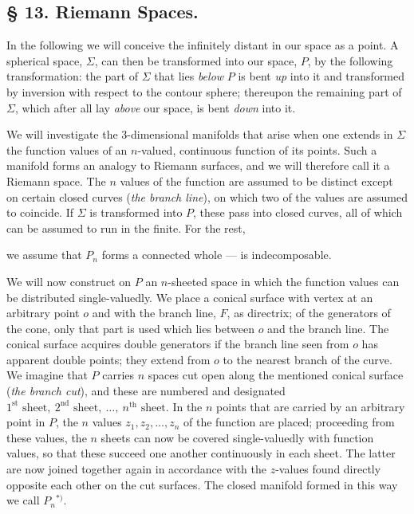 \documentclass{article}
\begin{document}
\subsection*{§ 13. Riemann Spaces.}

In the following we will conceive the infinitely distant in our space as a point. A spherical space, $\Sigma$, can then be transformed into our space, $P$, by the following transformation: the part of $\Sigma$ that lies \emph{below} $P$ is bent \emph{up} into it and transformed by inversion with respect to the contour sphere; thereupon the remaining part of $\Sigma$, which after all lay \emph{above} our space, is bent \emph{down} into it.

We will investigate the 3-dimensional manifolds that arise when one extends in $\Sigma$ the function values of an $n$-valued, continuous function of its points. Such a manifold forms an analogy to Riemann surfaces, and we will therefore call it a Riemann space. The $n$ values of the function are assumed to be distinct except on certain closed curves (\emph{the branch line}), on which two of the values are assumed to coincide. If $\Sigma$ is transformed into $P$, these pass into closed curves, all of which can be assumed to run in the finite. For the rest,

we assume that $P_n$ forms a connected whole --- is indecomposable.

We will now construct on $P$ an $n$-sheeted space in which the function values can be distributed single-valuedly. We place a conical surface with vertex at an arbitrary point $o$ and with the branch line, $F$, as directrix; of the generators of the cone, only that part is used which lies between $o$ and the branch line. The conical surface acquires double generators if the branch line seen from $o$ has apparent double points; they extend from $o$ to the nearest branch of the curve. We imagine that $P$ carries $n$ spaces cut open along the mentioned conical surface (\emph{the branch cut}), and these are numbered and designated $1^{\text{st}}\text{ sheet}, \ 2^{\text{nd}}\text{ sheet}, \ \dots, \ n^{\text{th}}\text{ sheet}$. In the $n$ points that are carried by an arbitrary point in $P$, the $n$ values $z_1, z_2, \dots, z_n$ of the function are placed; proceeding from these values, the $n$ sheets can now be covered single-valuedly with function values, so that these succeed one another continuously in each sheet. The latter are now joined together again in accordance with the $z$-values found directly opposite each other on the cut surfaces. The closed manifold formed in this way we call $P_n$${}^{*)}$.
\end{document}
